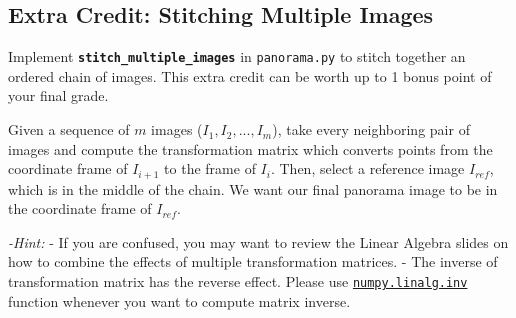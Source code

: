 \documentclass[11pt]{article}
\begin{document}
    \hypertarget{extra-credit-stitching-multiple-images}{%
\subsection{Extra Credit: Stitching Multiple
Images}\label{extra-credit-stitching-multiple-images}}

Implement \textbf{\texttt{stitch\_multiple\_images}} in
\texttt{panorama.py} to stitch together an ordered chain of images. This
extra credit can be worth up to 1 bonus point of your final grade.

Given a sequence of \(m\) images (\(I_1, I_2,...,I_m\)), take every
neighboring pair of images and compute the transformation matrix which
converts points from the coordinate frame of \(I_{i+1}\) to the frame of
\(I_{i}\). Then, select a reference image \(I_{ref}\), which is in the
middle of the chain. We want our final panorama image to be in the
coordinate frame of \(I_{ref}\).

\emph{-Hint:} - If you are confused, you may want to review the Linear
Algebra slides on how to combine the effects of multiple transformation
matrices. - The inverse of transformation matrix has the reverse effect.
Please use
\href{https://docs.scipy.org/doc/numpy/reference/generated/numpy.linalg.inv.html}{\texttt{numpy.linalg.inv}}
function whenever you want to compute matrix inverse.
\end{document}
